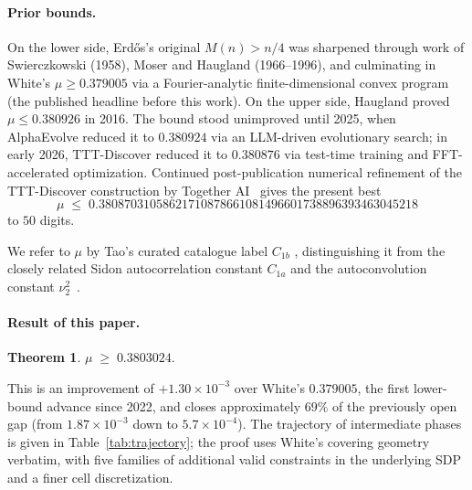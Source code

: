 \documentclass[11pt]{article}
\theoremstyle{plain}
\newtheorem{theorem}{Theorem}
\theoremstyle{definition}
\begin{document}
\paragraph{Prior bounds.}
On the lower side, Erd\H{o}s's original $M(n) > n/4$ was sharpened
through work of Swierczkowski (1958), Moser and Haugland
(1966--1996), and culminating in White's $\mu \ge 0.379005$
\cite{White2023} via a Fourier-analytic finite-dimensional convex
program (the published headline before this work).
On the upper side, Haugland \cite{Haugland2016} proved $\mu \le
0.380926$ in 2016. The bound stood unimproved until 2025, when
AlphaEvolve \cite{AlphaEvolve2025} reduced it to $0.380924$ via an
LLM-driven evolutionary search; in early 2026, TTT-Discover
\cite{TTTDiscover2026} reduced it to $0.380876$ via test-time training
and FFT-accelerated optimization. Continued post-publication numerical
refinement of the TTT-Discover construction by Together
AI~\cite{TogetherComputer2026} gives the present best
\[
\mu \;\le\; 0.38087031058621710878661081496601738896393463045218
\]
to $50$ digits.

We refer to $\mu$ by Tao's curated catalogue label $C_{1b}$
\cite{TaoOptProb}, distinguishing it from the closely related Sidon
autocorrelation constant $C_{1a}$ and the autoconvolution constant
$\nu_2^2$~\cite{Rechnitzer2026}.

\paragraph{Result of this paper.}
\begin{theorem}\label{thm:main}
$\mu \;\ge\; 0.3803024.$
\end{theorem}

This is an improvement of $+1.30 \times 10^{-3}$ over White's
$0.379005$, the first lower-bound advance since 2022, and closes
approximately $69\%$ of the previously open gap (from
$1.87 \times 10^{-3}$ down to $5.7 \times 10^{-4}$). The trajectory of
intermediate phases is given in Table~\ref{tab:trajectory}; the proof
uses White's covering geometry verbatim, with five families of
additional valid constraints in the underlying SDP and a finer cell
discretization.
\end{document}
